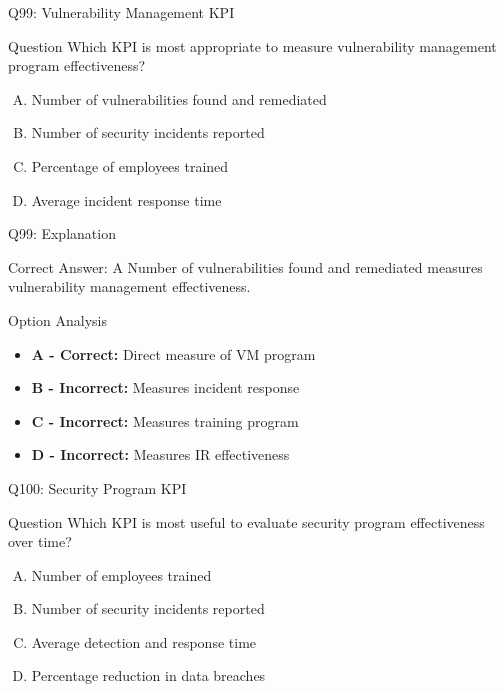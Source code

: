 \documentclass{beamer}
\begin{document}
	\begin{frame}{Q99: Vulnerability Management KPI}
		\begin{block}{Question}
			Which KPI is most appropriate to measure vulnerability management program effectiveness?
		\end{block}
		\begin{enumerate}[(A)]
			\item Number of vulnerabilities found and remediated
			\item Number of security incidents reported
			\item Percentage of employees trained
			\item Average incident response time
		\end{enumerate}
	\end{frame}
	
	\begin{frame}{Q99: Explanation}
		\begin{block}{Correct Answer: A}
			Number of vulnerabilities found and remediated measures vulnerability management effectiveness.
		\end{block}
		\begin{block}{Option Analysis}
			\begin{itemize}
				\item \textbf{A - Correct:} Direct measure of VM program
				\item \textbf{B - Incorrect:} Measures incident response
				\item \textbf{C - Incorrect:} Measures training program
				\item \textbf{D - Incorrect:} Measures IR effectiveness
			\end{itemize}
		\end{block}
	\end{frame}
	
	\begin{frame}{Q100: Security Program KPI}
		\begin{block}{Question}
			Which KPI is most useful to evaluate security program effectiveness over time?
		\end{block}
		\begin{enumerate}[(A)]
			\item Number of employees trained
			\item Number of security incidents reported
			\item Average detection and response time
			\item Percentage reduction in data breaches
		\end{enumerate}
	\end{frame}
	
\end{document}
